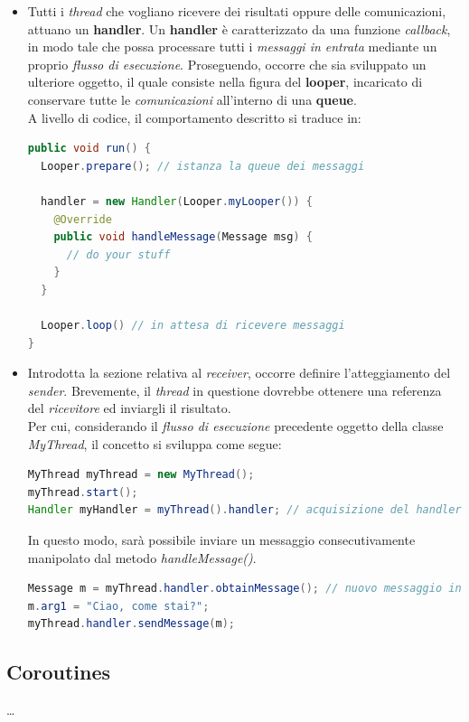 \documentclass{article}
\begin{document}
\begin{itemize}[label={-}]
  \itemsep0em
  \item Tutti i \textit{thread} che vogliano ricevere dei risultati oppure delle comunicazioni, attuano un \textbf{handler}. Un \textbf{handler} è caratterizzato da una funzione \textit{callback}, in modo tale che possa processare tutti i \textit{messaggi in entrata} mediante un proprio \textit{flusso di esecuzione}. Proseguendo, occorre che sia sviluppato un ulteriore oggetto, il quale consiste nella figura del \textbf{looper}, incaricato di conservare tutte le \textit{comunicazioni} all'interno di una \textbf{queue}.\vspace*{7pt}\\
  A livello di codice, il comportamento descritto si traduce in:
  \begin{lstlisting}[language=JAVA]
public void run() {
  Looper.prepare(); // istanza la queue dei messaggi

  handler = new Handler(Looper.myLooper()) {
    @Override
    public void handleMessage(Message msg) {
      // do your stuff
    }
  }

  Looper.loop() // in attesa di ricevere messaggi
}
  \end{lstlisting}
  \item Introdotta la sezione relativa al \textit{receiver}, occorre definire l'atteggiamento del \textit{sender}. Brevemente, il \textit{thread} in questione dovrebbe ottenere una referenza del \textit{ricevitore} ed inviargli il risultato.\vspace*{7pt}\\ Per cui, considerando il \textit{flusso di esecuzione} precedente oggetto della classe \textit{MyThread}, il concetto si sviluppa come segue:
  \begin{lstlisting}[language=JAVA]
MyThread myThread = new MyThread();
myThread.start();
Handler myHandler = myThread().handler; // acquisizione del handler
  \end{lstlisting}
  In questo modo, sarà possibile inviare un messaggio consecutivamente manipolato dal metodo \textit{handleMessage()}.
  \begin{lstlisting}[language=JAVA]
Message m = myThread.handler.obtainMessage(); // nuovo messaggio inviato al mHandler del thread in attesa
m.arg1 = "Ciao, come stai?";
myThread.handler.sendMessage(m);
  \end{lstlisting}
\end{itemize}

\subsection*{Coroutines}
\dots
\end{document}

